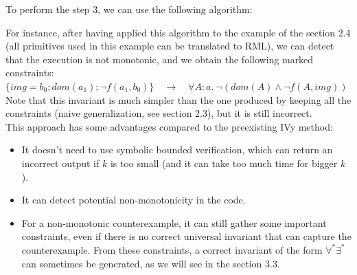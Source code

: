 \documentclass[11pt,a4paper,oldfontcommands,openany]{memoir}
\begin{document}
    To perform the step 3, we can use the following algorithm:

    \begin{algorithm}[H]
    \end{algorithm}\hfill

    For instance, after having applied this algorithm to the example of the section 2.4 (all primitives used in this example can be translated to RML),
    we can detect that the execution is not monotonic, and we obtain the following marked constraints:\\
    \(\{img=b_0 ; dom(a_1) ; \neg f(a_1,b_0)\} \quad \longrightarrow \quad \forall A:a.\ \neg (dom(A) \land \neg f(A,img))\)\\
    Note that this invariant is much simpler than the one produced by keeping all the constraints (naive generalization, see section 2.3), but it is still incorrect.\\

    This approach has some advantages compared to the preexisting IVy method:
    \begin{itemize}
        \item It doesn't need to use symbolic bounded verification, which can return an incorrect output if \(k\) is too small (and it can take too much time for bigger \(k\)).
        \item It can detect potential non-monotonicity in the code.
        \item For a non-monotonic counterexample, it can still gather some important constraints, even if there is no correct universal invariant that can capture the counterexample.
        From these constraints, a correct invariant of the form \(\forall^*\exists^*\) can sometimes be generated, as we will see in the section 3.3.
    \end{itemize}
\end{document}
